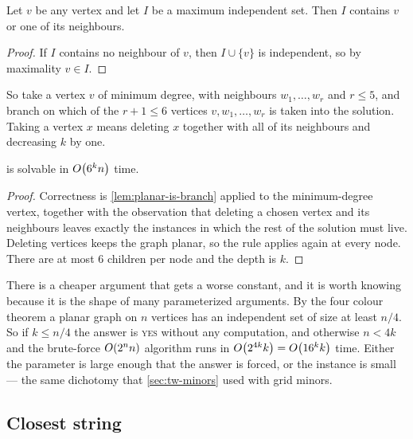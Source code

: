\begin{lemma}\label{lem:planar-is-branch}
Let $v$ be any vertex and let $I$ be a maximum independent set. Then $I$
contains $v$ or one of its neighbours.
\end{lemma}

\begin{proof}
If $I$ contains no neighbour of $v$, then $I \cup \{v\}$ is independent, so by
maximality $v \in I$.
\end{proof}

So take a vertex $v$ of minimum degree, with neighbours $w_1, \ldots, w_r$ and
$r \le 5$, and branch on which of the $r+1 \le 6$ vertices
$v, w_1, \ldots, w_r$ is taken into the solution. Taking a vertex $x$ means
deleting $x$ together with all of its neighbours and decreasing $k$ by one.

\begin{theorem}\label{thm:fpt-planar-is}
 is solvable in $O\!\left(6^k n\right)$ time.
\end{theorem}

\begin{proof}
Correctness is \cref{lem:planar-is-branch} applied to the minimum-degree
vertex, together with the observation that deleting a chosen vertex and its
neighbours leaves exactly the instances in which the rest of the solution must
live. Deleting vertices keeps the graph planar, so the rule applies again at
every node. There are at most $6$ children per node and the depth is $k$.
\end{proof}

\begin{intuition}
There is a cheaper argument that gets a worse constant, and it is worth knowing
because it is the shape of many parameterized arguments. By the four colour
theorem a planar graph on $n$ vertices has an independent set of size at least
$n/4$. So if $k \le n/4$ the answer is \textsc{yes} without any computation, and
otherwise $n < 4k$ and the brute-force $O\!\left(2^n n\right)$ algorithm runs in
$O\!\left(2^{4k}k\right) = O\!\left(16^k k\right)$ time. Either the parameter is large enough
that the answer is forced, or the instance is small --- the same dichotomy that
\cref{sec:tw-minors} used with grid minors.
\end{intuition}

\subsection{Closest string}

